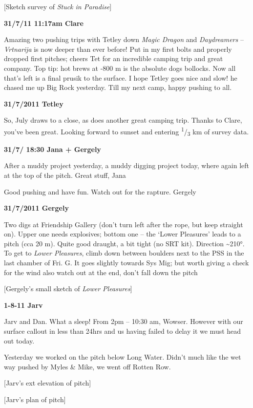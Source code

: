 {[}Sketch survey of \emph{Stuck in Paradise}{]}

\textbf{31/7/11 11:17am Clare}

Amazing two pushing trips with Tetley down \emph{Magic Dragon} and
\emph{Daydreamers} -- \emph{Vrtnarija} is now deeper than ever before!
Put in my first bolts and properly dropped first pitches; cheers Tet for
an incredible camping trip and great company. Top tip: hot brews at -800
m is the absolute dogs bollocks. Now all that's left is a final prusik
to the surface. I hope Tetley goes nice and slow! he chased me up Big
Rock yesterday. Till my next camp, happy pushing to all.

\textbf{31/7/2011 Tetley}

So, July draws to a close, as does another great camping trip. Thanks to
Clare, you've been great. Looking forward to sunset and entering
\textsuperscript{1}/\textsubscript{3} km of survey data.

\textbf{31/7/ 18:30 Jana + Gergely}

After a muddy project yesterday, a muddy digging project today, where
again left at the top of the pitch. Great stuff, Jana

Good pushing and have fun. Watch out for the rapture. Gergely

\textbf{31/7/2011 Gergely}

Two digs at Friendship Gallery (don't turn left after the rope, but keep
straight on). Upper one needs explosives; bottom one -- the `Lower
Pleasures' leads to a pitch (cca 20 m). Quite good draught, a bit tight
(no SRT kit). Direction \textasciitilde 210°. To get to \emph{Lower
Pleasures}, climb down between boulders next to the PSS in the last
chamber of Fri. G. It goes slightly towards Sys Mig; but worth giving a
check for the wind also watch out at the end, don't fall down the pitch

{[}Gergely's small sketch of \emph{Lower Pleasures}{]}

\textbf{1-8-11 Jarv}

Jarv and Dan. What a sleep! From 2pm -- 10:30 am, Wowser. However with
our surface callout in less than 24hrs and us having failed to delay it
we must head out today.

Yesterday we worked on the pitch below Long Water. Didn't much like the
wet way pushed by Myles \& Mike, we went off Rotten Row.

{[}Jarv's ext elevation of pitch{]}

{[}Jarv's plan of pitch{]}

